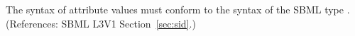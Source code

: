 The syntax of  attribute values must conform to the syntax of the
SBML type .  (References: SBML L3V1 Section~\ref{sec:sid}.)

